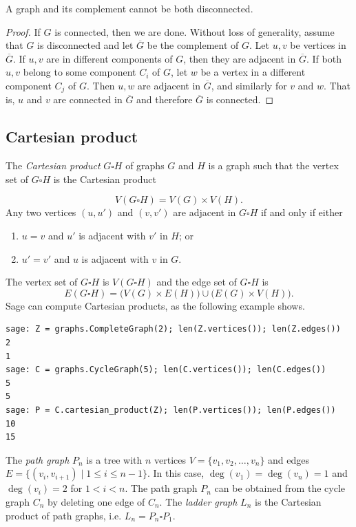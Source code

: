 \begin{theorem}
A graph and its complement cannot be both disconnected.
\end{theorem}

\begin{proof}
If $G$ is connected, then we are done. Without loss of generality,
assume that $G$ is disconnected and let $\overline{G}$ be the
complement of $G$. Let $u,v$ be vertices in $\overline{G}$. If $u,v$
are in different components of $G$, then they are adjacent in
$\overline{G}$. If both $u,v$ belong to some component $C_i$ of $G$,
let $w$ be a vertex in a different component $C_j$ of $G$. Then $u,w$
are adjacent in $\overline{G}$, and similarly for $v$ and $w$. That is,
$u$ and $v$ are connected in $\overline{G}$ and therefore $\overline{G}$
is connected.
\end{proof}



\subsection{Cartesian product}
\index{$\square$}

The \emph{Cartesian product} $G \square H$ of graphs $G$ and $H$ is a
graph such that the vertex set of $G \square H$ is the Cartesian
product

\[
V(G \square H) = V(G) \times V(H).
\]
Any two vertices $(u, u')$ and $(v, v')$
are adjacent in $G \square H$ if and only if either
%
\begin{enumerate}
\item $u = v$ and $u'$ is adjacent with $v'$ in $H$; or

\item $u' = v'$ and $u$ is adjacent with $v$ in $G$.
\end{enumerate}
The vertex set of $G \square H$ is $V(G \square H)$
and the edge set of $G \square H$ is
\[
E(G \square H)
=
\big(V(G) \times E(H)\big) \cup \big(E(G) \times V(H)\big).
\]
%
Sage can compute Cartesian products, as the following example shows.
%
\begin{lstlisting}
sage: Z = graphs.CompleteGraph(2); len(Z.vertices()); len(Z.edges())
2
1
sage: C = graphs.CycleGraph(5); len(C.vertices()); len(C.edges())
5
5
sage: P = C.cartesian_product(Z); len(P.vertices()); len(P.edges())
10
15
\end{lstlisting}

The \emph{path graph} $P_n$ is a tree with $n$ vertices
$V = \{v_1, v_2, \dots, v_n\}$ and edges
$E = \{ (v_i, v_{i+1}) \;|\; 1 \leq i \leq n-1 \}$. In this case,
$\deg(v_1) = \deg(v_n) = 1$ and $\deg(v_i) = 2$ for $1 < i < n$. The
path graph $P_n$ can be obtained from the cycle graph $C_n$ by
deleting one edge of $C_n$. The \emph{ladder graph} $L_n$ is the
Cartesian product of path graphs, i.e. $L_n = P_n \square P_1$.

